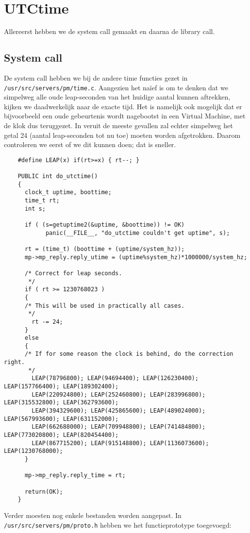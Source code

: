 \documentclass[11pt]{article}
\begin{document}
\section*{UTCtime}
Allereerst hebben we de system call gemaakt en daarna de library call.

\subsection*{System call}
De system call hebben we bij de andere time functies gezet in \verb+/usr/src/servers/pm/time.c+.
Aangezien het na\"ief is om te denken dat we simpelweg alle oude leap-seconden van het huidige
aantal kunnen aftrekken, kijken we daadwerkelijk naar de exacte tijd. Het is namelijk ook mogelijk
dat er bijvoorbeeld een oude gebeurtenis wordt nagebootst in een Virtual Machine, met de klok
dus teruggezet. In veruit de meeste gevallen zal echter simpelweg het getal 24 (aantal leap-seconden tot
nu toe) moeten worden afgetrokken. Daarom controleren we eerst of we dit kunnen doen; dat is sneller.

\begin{verbatim}
	#define LEAP(x) if(rt>=x) { rt--; }

	PUBLIC int do_utctime()
	{
	  clock_t uptime, boottime;
	  time_t rt;
	  int s;
	
	  if ( (s=getuptime2(&uptime, &boottime)) != OK)
			panic(__FILE__, "do_utctime couldn't get uptime", s);
	
	  rt = (time_t) (boottime + (uptime/system_hz));
	  mp->mp_reply.reply_utime = (uptime%system_hz)*1000000/system_hz;
	  
	  /* Correct for leap seconds.
	   */
	  if ( rt >= 1230768023 )
	  {
	  /* This will be used in practically all cases.
	   */
	    rt -= 24;
	  }
	  else
	  {
	  /* If for some reason the clock is behind, do the correction right.
	   */
	    LEAP(78796800); LEAP(94694400); LEAP(126230400); LEAP(157766400); LEAP(189302400);
	    LEAP(220924800); LEAP(252460800); LEAP(283996800); LEAP(315532800); LEAP(362793600); 
	    LEAP(394329600); LEAP(425865600); LEAP(489024000); LEAP(567993600); LEAP(631152000); 
	    LEAP(662688000); LEAP(709948800); LEAP(741484800); LEAP(773020800); LEAP(820454400); 
	    LEAP(867715200); LEAP(915148800); LEAP(1136073600); LEAP(1230768000);
	  }
	  
	  mp->mp_reply.reply_time = rt;
	  
	  return(OK);
	}
\end{verbatim}

Verder moesten nog enkele bestanden worden aangepast. In \verb+/usr/src/servers/pm/proto.h+ hebben
we het functieprototype toegevoegd:
\end{document}
